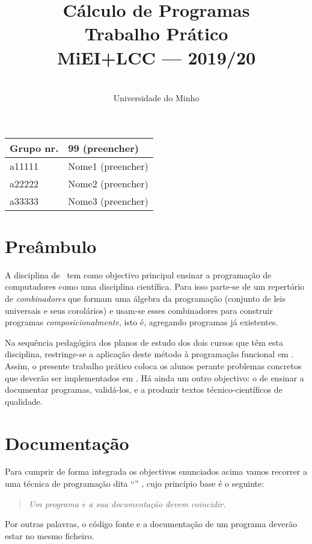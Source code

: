 \documentclass[a4paper]{article}
\title{
       	    Cálculo de Programas
\\
       	Trabalho Prático
\\
       	MiEI+LCC --- 2019/20
}
\author{
       	\dium
\\
       	Universidade do Minho
}
\date\mydate
\begin{document}
\maketitle

\begin{center}\large
\begin{tabular}{ll}
\textbf{Grupo} nr. & 99 (preencher)
\\\hline
a11111 & Nome1 (preencher)	
\\
a22222 & Nome2 (preencher)	
\\
a33333 & Nome3 (preencher)	
\end{tabular}
\end{center}

\section{Preâmbulo}

A disciplina de \CP\ tem como objectivo principal ensinar
a progra\-mação de computadores como uma disciplina científica. Para isso
parte-se de um repertório de \emph{combinadores} que formam uma álgebra da
programação (conjunto de leis universais e seus corolários) e usam-se esses
combinadores para construir programas \emph{composicionalmente}, isto é,
agregando programas já existentes.
  
Na sequência pedagógica dos planos de estudo dos dois cursos que têm
esta disciplina, restringe-se a aplicação deste método à programação
funcional em \Haskell. Assim, o presente trabalho prático coloca os
alunos perante problemas concretos que deverão ser implementados em
\Haskell.  Há ainda um outro objectivo: o de ensinar a documentar
programas, validá-los, e a produzir textos técnico-científicos de
qualidade.

\section{Documentação} Para cumprir de forma integrada os objectivos
enunciados acima vamos recorrer a uma técnica de programa\-ção dita
``'' \cite{Kn92}, cujo princípio base é o seguinte:
\begin{quote}\em Um programa e a sua documentação devem coincidir.
\end{quote} Por outras palavras, o código fonte e a documentação de um
programa deverão estar no mesmo ficheiro.
\end{document}
